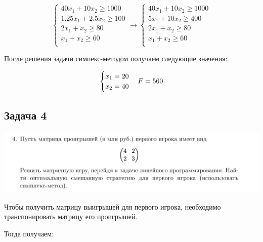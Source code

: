 \documentclass[9pt, a4paper]{article}
\begin{document}
    \begin{equation}
        \begin{cases}
            40x_1 + 10x_2 \geqslant 1000\\
            1.25x_1 + 2.5x_2 \geqslant 100\\
            2x_1 + x_2 \geqslant 80\\
            x_1 + x_2 \geqslant 60\\
        \end{cases}\label{eq:equation18}
        \rightarrow
        \begin{cases}
            40x_1 + 10x_2 \geqslant 1000\\
            5x_1 + 10x_2 \geqslant 400\\
            2x_1 + x_2 \geqslant 80\\
            x_1 + x_2 \geqslant 60\\
        \end{cases}
    \end{equation}

    После решения задачи симпекс-методом получаем следующие значения:

    \begin{equation}
        \begin{cases}
            x_1 = 20\\
            x_2 = 40\\
        \end{cases}\label{eq:equation19}
        \newline
        F = 560
    \end{equation}

    \newpage

    \subsection{Задача 4}\label{subsec:task4}
    \includegraphics[width=1\textwidth]{docs/4}

    Чтобы получить матрицу выигрышей для первого игрока, необходимо
    транспонировать матрицу его проигрышей.

    Тогда получаем:
\end{document}
